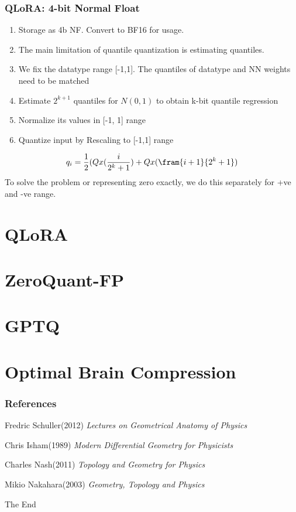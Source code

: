 \documentclass{beamer}
\theoremstyle{plain}
\theoremstyle{definition}
\theoremstyle{remark}
\numberwithin{equation}{section}
\numberwithin{figure}{section}
\numberwithin{theorem}{section}
\begin{document}
\begin{frame}[shrink]
    \frametitle{QLoRA: 4-bit Normal Float}
    \begin{enumerate}
        \item Storage as 4b NF. Convert to BF16 for usage.
        \item The main limitation of quantile quantization is estimating quantiles.
        \item We fix the datatype range [-1,1]. The quantiles of datatype and NN weights need to be matched
        \item Estimate $2^{k+1}$ quantiles for $N(0,1)$ to obtain k-bit quantile regression
        \item Normalize its values in [-1, 1] range
        \item Quantize input by Rescaling to [-1,1] range
    \end{enumerate}                        

    \begin{align}
        q_i = \frac{1}{2} (Qx(\frac{i}{2^k+1}) + Qx(\fram{i+1}{2^k+1})    
    \end{align}
    To solve the problem or representing zero exactly, we do this separately for +ve and -ve range.
\end{frame}                        
                        
\section{QLoRA}
\section{ZeroQuant-FP}
\section{GPTQ}
\section{Optimal Brain Compression}



\begin{frame}
\frametitle{References}
\footnotesize{
\begin{thebibliography}{99} %
  Fredric Schuller(2012)
\textit{Lectures on Geometrical Anatomy of Physics}

 Chris Isham(1989)
\textit{ Modern Differential Geometry for Physicists}

 Charles Nash(2011)
\textit{ Topology and Geometry for Physics }

 Mikio Nakahara(2003)
\textit{ Geometry, Topology and Physics}

\end{thebibliography}
}
\end{frame}


\begin{frame}
\Huge{\centerline{The End}}
\end{frame}

\end{document}
